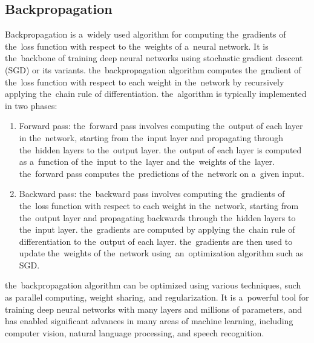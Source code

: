         \subsection{Backpropagation}\label{subsec:backpropagation}
        Backpropagation is a~widely used algorithm for computing the~gradients of the~loss function with
        respect to the~weights of a~neural network. It is the~backbone of training deep neural networks using
        stochastic gradient descent (SGD) or its variants.
        the~backpropagation algorithm computes the~gradient of the~loss function with respect to each
        weight in the~network by recursively applying the~chain rule of differentiation.
        the~algorithm is typically implemented in two phases:
        \begin{enumerate}
            \item Forward pass: the~forward pass involves computing the~output of each layer in the~network,
            starting from the~input layer and propagating through the~hidden layers to the~output layer.
            the~output of each layer is computed as a~function of the~input to the~layer and the~weights of the~layer.
            the~forward pass computes the~predictions of the~network on a~given input.
            \item Backward pass: the~backward pass involves computing the~gradients of the~loss function with
            respect to each weight in the~network, starting from the~output layer and propagating backwards
            through the~hidden layers to the~input layer. the~gradients are computed by applying the~chain rule of
            differentiation to the~output of each layer. the~gradients are then used to update the~weights of
            the~network using~an~optimization algorithm such as SGD.
        \end{enumerate}
        the~backpropagation algorithm can be optimized using various techniques, such as parallel computing, weight
        sharing, and regularization. It is a~powerful tool for training deep neural networks with many layers and
        millions of parameters, and has enabled significant advances in many areas of machine learning, including
        computer vision, natural language processing, and speech recognition.
